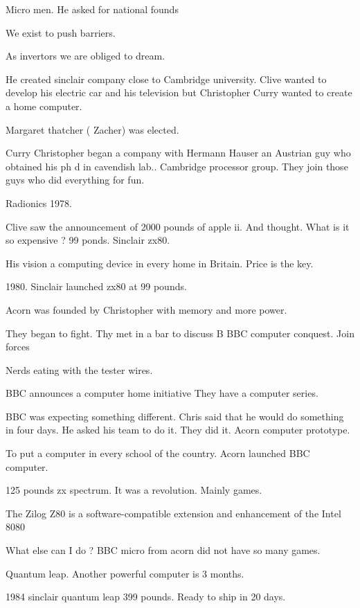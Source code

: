    Micro men.
   He asked for national founds
   
   We exist to push barriers. 
   
   As invertors we are obliged to dream. 
   
   He created sinclair company close to Cambridge university. 
   Clive wanted to develop his electric car and his television but Christopher Curry wanted to create a home computer. 
   
   Margaret thatcher ( Zacher) was elected. 
   
   Curry Christopher began a company with Hermann Hauser an Austrian guy who obtained his ph d in cavendish lab..  Cambridge processor group. 
   They join those guys who did everything for fun. 
   
   Radionics 1978. 
   
   Clive saw the announcement of 2000 pounds of apple ii. And thought. What is it so expensive ? 
   99 ponds. Sinclair zx80. 
   
   His vision a computing device in every home in Britain. Price is the key. 
   
   1980. Sinclair launched zx80 at 99 pounds. 
   
   Acorn was founded by Christopher with memory and more power. 
   
   They began to fight. Thy met in a bar to discuss B BBC computer conquest. Join forces 
   
   Nerds eating with the tester wires.
   
   
   BBC announces a computer home initiative 
   They have a computer series. 
   
   BBC was expecting something different. Chris said that he would do something in four days. 
   He asked his team to do it. They did it. Acorn computer prototype. 
   
   To put a computer in every school of the country. 
   Acorn launched BBC computer. 
   
   125 pounds zx spectrum. 
   It was a revolution. 
   Mainly games. 
   
   The Zilog Z80 is a software-compatible extension and enhancement of the Intel 8080 
   
   What else can I do ? 
   BBC micro from acorn did not have so many games. 
   
   Quantum leap. Another powerful computer is 3 months. 
   
   1984 sinclair quantum leap 399 pounds. Ready to ship in 20 days. 
   
